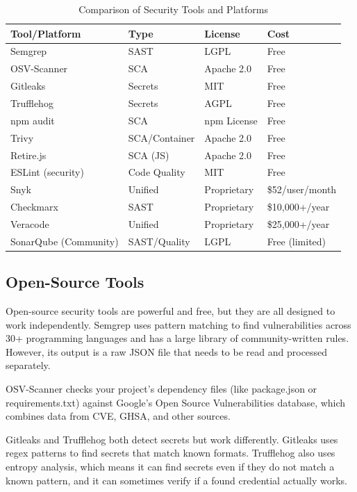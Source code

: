 \documentclass[12pt,a4paper]{report}
\begin{document}
\begin{table}[H]
\centering
\caption{Comparison of Security Tools and Platforms}
\label{tab:tool_comparison}
\begin{tabular}{|l|l|l|l|}
\hline
\textbf{Tool/Platform} & \textbf{Type} & \textbf{License} & \textbf{Cost} \\
\hline
Semgrep & SAST & LGPL & Free \\
\hline
OSV-Scanner & SCA & Apache 2.0 & Free \\
\hline
Gitleaks & Secrets & MIT & Free \\
\hline
Trufflehog & Secrets & AGPL & Free \\
\hline
npm audit & SCA & npm License & Free \\
\hline
Trivy & SCA/Container & Apache 2.0 & Free \\
\hline
Retire.js & SCA (JS) & Apache 2.0 & Free \\
\hline
ESLint (security) & Code Quality & MIT & Free \\
\hline
Snyk & Unified & Proprietary & \$52/user/month \\
\hline
Checkmarx & SAST & Proprietary & \$10,000+/year \\
\hline
Veracode & Unified & Proprietary & \$25,000+/year \\
\hline
SonarQube (Community) & SAST/Quality & LGPL & Free (limited) \\
\hline
\end{tabular}
\end{table}

\subsection{Open-Source Tools}

Open-source security tools are powerful and free, but they are all designed to work independently. Semgrep \cite{semgrep} uses pattern matching to find vulnerabilities across 30+ programming languages and has a large library of community-written rules. However, its output is a raw JSON file that needs to be read and processed separately.

OSV-Scanner \cite{osv} checks your project's dependency files (like package.json or requirements.txt) against Google's Open Source Vulnerabilities database, which combines data from CVE, GHSA, and other sources.

Gitleaks \cite{gitleaks} and Trufflehog \cite{trufflehog} both detect secrets but work differently. Gitleaks uses regex patterns to find secrets that match known formats. Trufflehog also uses entropy analysis, which means it can find secrets even if they do not match a known pattern, and it can sometimes verify if a found credential actually works.
\end{document}
